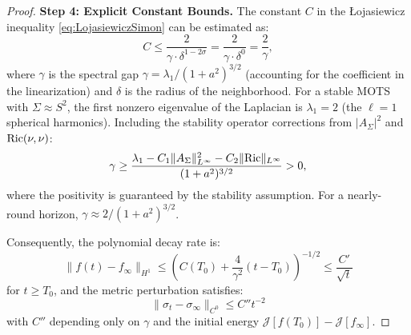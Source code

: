 \begin{proof}
\textbf{Step 4: Explicit Constant Bounds.}
The constant $C$ in the \L{}ojasiewicz inequality \eqref{eq:LojasiewiczSimon} can be estimated as:
\[
    C \le \frac{2}{\gamma \cdot \delta^{1-2\sigma}} = \frac{2}{\gamma \cdot \delta^0} = \frac{2}{\gamma},
\]
where $\gamma$ is the spectral gap $\gamma = \lambda_1 / (1+a^2)^{3/2}$ (accounting for the coefficient in the linearization) and $\delta$ is the radius of the neighborhood. For a stable MOTS with $\Sigma \approx S^2$, the first nonzero eigenvalue of the Laplacian is $\lambda_1 = 2$ (the $\ell = 1$ spherical harmonics). Including the stability operator corrections from $|A_\Sigma|^2$ and $\mathrm{Ric}(\nu,\nu)$:
\[
    \gamma \ge \frac{\lambda_1 - C_1 \|A_\Sigma\|_{L^\infty}^2 - C_2 \|\mathrm{Ric}\|_{L^\infty}}{(1+a^2)^{3/2}} > 0,
\]
where the positivity is guaranteed by the stability assumption. For a nearly-round horizon, $\gamma \approx 2/(1+a^2)^{3/2}$.

Consequently, the polynomial decay rate is:
\[
    \|f(t) - f_\infty\|_{H^1} \le \left( C(T_0) + \frac{4}{\gamma^2} (t - T_0) \right)^{-1/2} \le \frac{C'}{\sqrt{t}}
\]
for $t \ge T_0$, and the metric perturbation satisfies:
\[
    \|\sigma_t - \sigma_\infty\|_{C^0} \le C'' t^{-2}
\]
with $C''$ depending only on $\gamma$ and the initial energy $\mathcal{J}[f(T_0)] - \mathcal{J}[f_\infty]$.
\end{proof}

